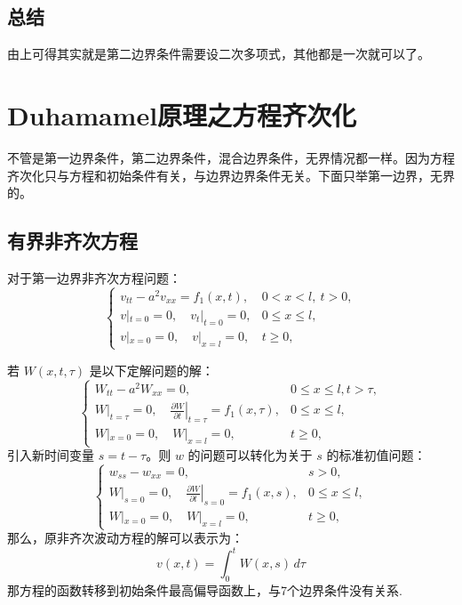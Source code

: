 \documentclass[12pt,a4paper]{article}
\numberwithin{subsection}{section}   %
\numberwithin{subsubsection}{subsection}
\theoremstyle{plain}
\theoremstyle{definition}
\theoremstyle{remark}
\theoremstyle{remark}
\begin{document}
	
	\subsection{总结}
	由上可得其实就是第二边界条件需要设二次多项式，其他都是一次就可以了。
	
	
	
		\newpage
	\section{Duhamamel原理之方程齐次化}
不管是第一边界条件，第二边界条件，混合边界条件，无界情况都一样。因为方程齐次化只与方程和初始条件有关，与边界边界条件无关。下面只举第一边界，无界的。
	
	
		\subsection{有界非齐次方程}

		
	对于第一边界非齐次方程问题：
	\begin{equation}
		\begin{cases}
			v_{tt} - a^2 v_{xx} = f_1(x, t), & 0 < x < l, \ t > 0, \\
			v|_{t=0} = 0, \quad v_t|_{t=0} = 0, & 0 \leq x \leq l, \\
			v|_{x=0} = 0, \quad v|_{x=l} = 0, & t \geq 0,
		\end{cases}
	\end{equation}
	
	若 \( W(x, t, \tau) \) 是以下定解问题的解：
\begin{equation}
	\begin{cases}
		W_{tt} - a^2 W_{xx} = 0, & 0 \leq x \leq l, t > \tau, \\
	W|_{t=\tau} = 0, \quad \left. \frac{\partial W}{\partial t} \right|_{t=\tau} = f_1(x, \tau), & 0 \leq x \leq l,\\
	W|_{x=0} = 0, \quad W|_{x=l} = 0, & t \geq 0,
	\end{cases}
\end{equation}	
	引入新时间变量 $s = t-\tau$。则 $w$ 的问题可以转化为关于 $s$ 的标准初值问题：
	\begin{equation}
	\begin{cases}
		w_{ss} - w_{xx} = 0, & s > 0, \\
		W|_{s=0} = 0, \quad \left. \frac{\partial W}{\partial t} \right|_{s=0} = f_1(x, s), & 0 \leq x \leq l,\\
	W|_{x=0} = 0, \quad W|_{x=l} = 0, & t \geq 0,
	\end{cases}
\end{equation}	
		那么，原非齐次波动方程的解可以表示为：
	\begin{equation}
		v(x, t) = \int_0^t W(x, s) \, d\tau
	\end{equation}
	那方程的函数转移到初始条件最高偏导函数上，与7个边界条件没有关系.
\end{document}
